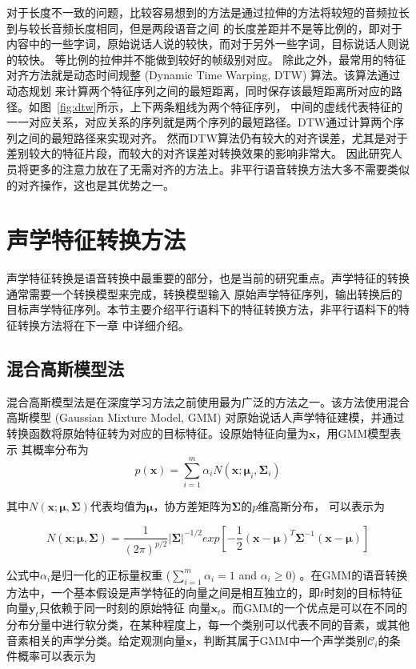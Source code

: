 对于长度不一致的问题，比较容易想到的方法是通过拉伸的方法将较短的音频拉长到与较长音频长度相同，但是两段语音之间
的长度差距并不是等比例的，即对于内容中的一些字词，原始说话人说的较快，而对于另外一些字词，目标说话人则说的较快。
等比例的拉伸并不能做到较好的帧级别对应。
除此之外，最常用的特征对齐方法就是动态时间规整 (Dynamic Time Warping, DTW) 算法。该算法通过动态规划
来计算两个特征序列之间的最短距离，同时保存该最短距离所对应的路径。如图~\ref{fig:dtw}所示，上下两条粗线为两个特征序列，
中间的虚线代表特征的一一对应关系，对应关系的序列就是两个序列的最短路径。DTW通过计算两个序列之间的最短路径来实现对齐。
然而DTW算法仍有较大的对齐误差，尤其是对于差别较大的特征片段，而较大的对齐误差对转换效果的影响非常大。
因此研究人员将更多的注意力放在了无需对齐的方法上。非平行语音转换方法大多不需要类似的对齐操作，这也是其优势之一。

\section{声学特征转换方法}
声学特征转换是语音转换中最重要的部分，也是当前的研究重点。声学特征的转换通常需要一个转换模型来完成，转换模型输入
原始声学特征序列，输出转换后的目标声学特征序列。本节主要介绍平行语料下的特征转换方法，非平行语料下的特征转换方法将在下一章
中详细介绍。

\subsection{混合高斯模型法}
混合高斯模型法是在深度学习方法之前使用最为广泛的方法之一。该方法使用混合高斯模型 (Gaussian Mixture Model, GMM) 
对原始说话人声学特征建模，并通过转换函数将原始特征转为对应的目标特征。设原始特征向量为$\mathbf{x}$，用GMM模型表示
其概率分布为
\begin{equation}
    \label{eq:gmm}
    p(\mathbf{x})=\sum^{m}_{i=1}\alpha_iN(\mathbf{x};\bm{\mu}_i,\bm{\Sigma}_i)
\end{equation}

其中$N(\mathbf{x};\bm{\mu},\bm{\Sigma})$代表均值为$\bm{\mu}$，协方差矩阵为$\bm{\Sigma}$的$p$维高斯分布，
可以表示为

\begin{equation}
    N(\mathbf{x};\bm{\mu},\bm{\Sigma})=\frac{1}{(2\pi)^{p/2}}\left| \bm{\Sigma} \right|^{-1/2} exp\left[ -\frac{1}{2}(\mathbf{x}-\bm{\mu})^{T}\bm{\Sigma}^{-1}(\mathbf{x}-\bm{\mu}) \right]
\end{equation}

公式中$\alpha_i$是归一化的正标量权重 ($\sum^{m}_{i=1}\alpha_i=1$ and $\alpha_i \ge 0$) 。在GMM的语音转换
方法中，一个基本假设是声学特征的向量之间是相互独立的，即$t$时刻的目标特征向量$\mathbf{y}_t$只依赖于同一时刻的原始特征
向量$\mathbf{x}_t$。而GMM的一个优点是可以在不同的分布分量中进行软分类，在某种程度上，每一个类别可以代表不同的音素，或其他
音素相关的声学分类。给定观测向量$\mathbf{x}$，判断其属于GMM中一个声学类别$\mathcal{C}_i$的条件概率可以表示为

